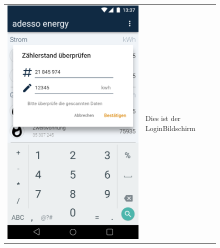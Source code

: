 \begin{figure}[h]
\begin{tabularx}{\textwidth}{X | X}
	\includegraphics[scale = 0.22]{img/AndroidMockup/check} & Dies ist der LoginBildschirm \\ 
\end{tabularx}
\end{figure}

